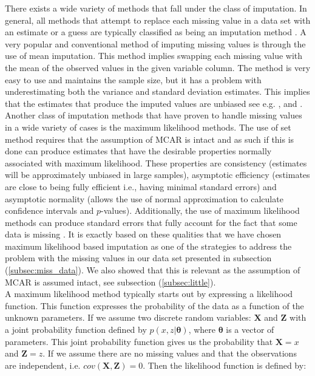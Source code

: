 \documentclass[../thesis.tex]{subfiles}
\begin{document}
\noindent There exists a wide variety of methods that fall under the class of imputation. In general, all methods that attempt to replace each missing value in a data set with an estimate or a guess are typically classified as being an imputation method \citep{allison1999missing}. A very popular and conventional method of imputing missing values is through the use of mean imputation. This method implies swapping each missing value with the mean of the observed values in the given variable column. The method is very easy to use and maintains the sample size, but it has a problem with underestimating both the variance and standard deviation estimates. This implies that the estimates that produce the imputed values are unbiased see e.g. \cite{scheffer2002dealing}, \cite{enders2010applied} and \cite{eekhout2012brief}. Another class of imputation methods that have proven to handle missing values in a wide variety of cases is the maximum likelihood methods. The use of set method requires that the assumption of MCAR is intact and as such if this is done can produce estimates that have the desirable properties normally associated with maximum likelihood. These properties are consistency (estimates will be approximately unbiased in large samples), asymptotic efficiency (estimates are close to being fully efficient i.e., having minimal standard errors) and asymptotic normality (allows the use of normal approximation to calculate confidence intervals and $p$-values). Additionally, the use of maximum likelihood methods can produce standard errors that fully account for the fact that some data is missing \citep{allison1999missing}. It is exactly based on these qualities that we have chosen maximum likelihood based imputation as one of the strategies to address the problem with the missing values in our data set presented in subsection (\ref{subsec:miss_data}). We also showed that this is relevant as the assumption of MCAR is assumed intact, see subsection (\ref{subsec:little}).\\
\indent A maximum likelihood method typically starts out by expressing a likelihood function. This function expresses the probability of the data as a function of the unknown parameters. If we assume two discrete random variables: $\mathbf{X}$ and $\mathbf{Z}$ with a joint probability function defined by $p(x,z|\boldsymbol{\theta})$, where $\boldsymbol{\theta}$ is a vector of parameters. This joint probability function gives us the probability that $\mathbf{X} = x$ and $\mathbf{Z} = z$. If we assume there are no missing values and that the observations are independent, i.e. $cov(\mathbf{X}, \mathbf{Z}) = 0$. Then the likelihood function is defined by:
\end{document}
